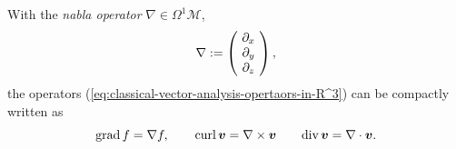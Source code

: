 \begin{beispiel}
	With the \emph{nabla operator}
	$\nabla \in \Omega^1 \mathscr{M}$,
	\begin{equation}
		\nabla := \left(\begin{array}{@{\ }c@{\ }}
		\partial_x \\ \partial_y \\\partial_z
	\end{array}\right),
	\label{eq:nabla-operator}
	\end{equation}
	the operators (\ref{eq:classical-vector-analysis-opertaors-in-R^3}) can be compactly written as
	\begin{equation}
		\mathrm{grad}\, f = \nabla f,
		\qquad
		\mathrm{curl}\, \mbox{$\boldsymbol{v}$} = \nabla \times \mbox{$\boldsymbol{v}$}
		\qquad
		\mathrm{div}\, \mbox{$\boldsymbol{v}$} = \nabla \cdot \mbox{$\boldsymbol{v}$}
		.
	\end{equation}
\end{beispiel}


